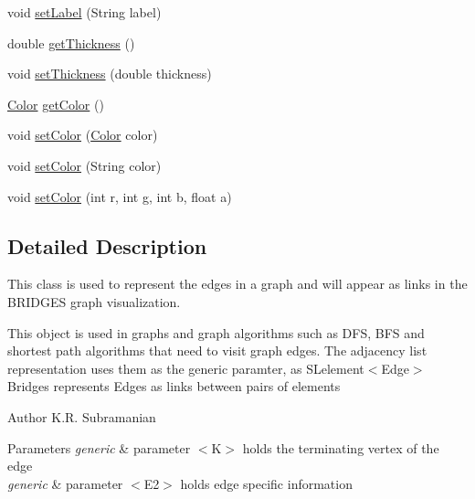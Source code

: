\begin{DoxyCompactItemize}
\item 
void \mbox{\hyperlink{classbridges_1_1base_1_1_edge_ad5f1d55a3c8caeb975f497dfe4f29242}{set\+Label}} (String label)
\item 
double \mbox{\hyperlink{classbridges_1_1base_1_1_edge_a3431e83235fc5d5dd5cf747ed4853881}{get\+Thickness}} ()
\item 
void \mbox{\hyperlink{classbridges_1_1base_1_1_edge_ae8d87539f03f04479e5f5710ea9bf260}{set\+Thickness}} (double thickness)
\item 
\mbox{\hyperlink{classbridges_1_1base_1_1_color}{Color}} \mbox{\hyperlink{classbridges_1_1base_1_1_edge_a243d9e6a57ebb570dda81bffe0cd4b77}{get\+Color}} ()
\item 
void \mbox{\hyperlink{classbridges_1_1base_1_1_edge_a77f6d36e94a3cbb8e478c85a1a6dad84}{set\+Color}} (\mbox{\hyperlink{classbridges_1_1base_1_1_color}{Color}} color)
\item 
void \mbox{\hyperlink{classbridges_1_1base_1_1_edge_adc2dbd9f8d74f8749ba64515ca052909}{set\+Color}} (String color)
\item 
void \mbox{\hyperlink{classbridges_1_1base_1_1_edge_a4ecf6bdaf140202b41c8a929fbdcdc0c}{set\+Color}} (int r, int g, int b, float a)
\end{DoxyCompactItemize}


\subsection{Detailed Description}
This class is used to represent the edges in a graph and will appear as links in the B\+R\+I\+D\+G\+ES graph visualization. 

This object is used in graphs and graph algorithms such as D\+FS, B\+FS and shortest path algorithms that need to visit graph edges. The adjacency list representation uses them as the generic paramter, as S\+Lelement$<$\+Edge$>$ Bridges represents Edges as links between pairs of elements

\begin{DoxyAuthor}{Author}
K.\+R. Subramanian
\end{DoxyAuthor}

\begin{DoxyParams}{Parameters}
{\em generic} & parameter $<$\+K$>$ holds the terminating vertex of the edge \\
\hline
{\em generic} & parameter $<$\+E2$>$ holds edge specific information \\
\hline
\end{DoxyParams}



